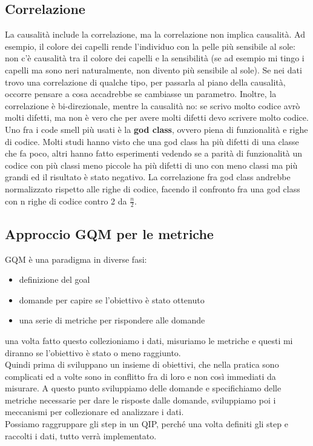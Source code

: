 \documentclass{article}
\begin{document}
\subsection{Correlazione}
La causalità include la correlazione, ma la correlazione non implica causalità. Ad esempio, il colore dei capelli rende l'individuo con la pelle più sensibile al sole: non c'è causalità tra il colore dei capelli e la sensibilità (se ad esempio mi tingo i capelli ma sono neri naturalmente, non divento più sensibile al sole). Se nei dati trovo una correlazione di qualche tipo, per passarla al piano della causalità, occorre pensare a cosa accadrebbe se cambiasse un parametro. Inoltre, la correlazione è bi-direzionale, mentre la causalità no: se scrivo molto codice avrò molti difetti, ma non è vero che per avere molti difetti devo scrivere molto codice.\\ Uno fra i code smell più usati è la \textbf{god class}, ovvero piena di funzionalità e righe di codice. Molti studi hanno visto che una god class ha più difetti di una classe che fa poco, altri hanno fatto esperimenti vedendo se a parità di funzionalità un codice con più classi meno piccole ha più difetti di uno con meno classi ma più grandi ed il risultato è stato negativo. La correlazione fra god class andrebbe normalizzato rispetto alle righe di codice, facendo il confronto fra una god class con n righe di codice contro 2 da $\frac{n}{2}$.
\subsection{Approccio GQM per le metriche}
GQM è una paradigma in diverse fasi:
\begin{itemize}
\item definizione del goal
\item domande per capire se l'obiettivo è stato ottenuto
\item una serie di metriche per rispondere alle domande
\end{itemize}
una volta fatto questo collezioniamo i dati, misuriamo le metriche e questi mi diranno se l'obiettivo è stato o meno raggiunto.\\ Quindi prima di sviluppano un insieme di obiettivi, che nella pratica sono complicati ed a volte sono in conflitto fra di loro e non così immediati da misurare. A questo punto sviluppiamo delle domande e specifichiamo delle metriche necessarie per dare le risposte dalle domande, sviluppiamo poi i meccanismi per collezionare ed analizzare i dati.\\ Possiamo raggruppare gli step in un QIP, perché una volta definiti gli step e raccolti i dati, tutto verrà implementato.
\end{document}
